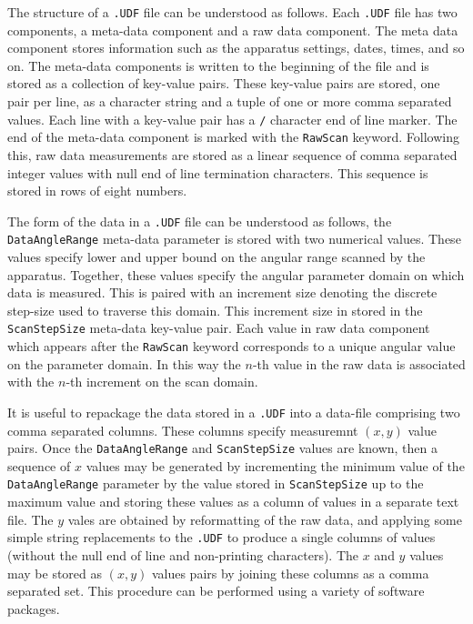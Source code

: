 \documentclass[10pt, a4paper, oneside]{article}
\begin{document}
\par{The structure of a \lstinline{.UDF} file can be understood as follows. Each \lstinline{.UDF} file has two components, a meta-data component and a raw data component. The meta data component stores information such as the apparatus settings, dates, times, and so on. The meta-data components is written to the beginning of the file and is stored as a collection of key-value pairs. These key-value pairs are stored, one pair per line, as a character string and a tuple of one or more comma separated values. Each line with a key-value pair has a \lstinline{/} character end of line marker. The end of the meta-data component is marked with the \lstinline{RawScan} keyword.  Following this, raw data measurements are stored as a linear sequence of comma separated integer values with null end of line termination characters.  This sequence is stored in rows of eight numbers.}

\par{The form of the data in a \lstinline{.UDF} file can be understood as follows, the \lstinline{DataAngleRange} meta-data parameter is stored with two numerical values. These values specify lower and upper bound on the angular range scanned by the apparatus. Together, these values specify the angular parameter domain on which data is measured. This is paired with an increment size denoting the discrete step-size used to traverse this domain. This increment size in stored in the \lstinline{ScanStepSize} meta-data key-value pair.  Each value in raw data component which appears after the \lstinline{RawScan} keyword corresponds to a unique angular value on the parameter domain.  In this way the $n$-th value in the raw data is associated with the $n$-th increment on the scan domain.}

\par{It is useful to repackage the data stored in a \lstinline{.UDF} into a data-file comprising two comma separated columns. These columns specify measuremnt $(x, y)$ value pairs.  Once the \lstinline{DataAngleRange} and \lstinline{ScanStepSize} values are known, then a sequence of $x$ values may be generated by incrementing the minimum value of the \lstinline{DataAngleRange} parameter by the value stored in \lstinline{ScanStepSize} up to the maximum value and storing these values as a column of values in a separate text file. The $y$ vales are obtained by reformatting of the raw data, and applying some simple string replacements to the \lstinline{.UDF} to produce a single columns of values (without the null end of line and non-printing characters).  The $x$ and $y$ values may be stored as $(x, y)$ values pairs by joining these columns as a comma separated set.  This procedure can be performed using a variety of software packages. }
\end{document}
